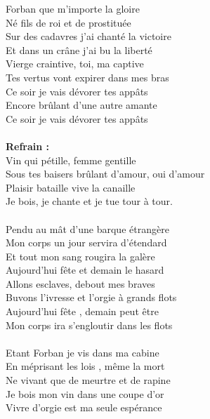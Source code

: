 
 Forban que m'importe la gloire
\\Né fils de roi et de prostituée
\\Sur des cadavres j'ai chanté la victoire
\\Et dans un crâne j'ai bu la liberté
\\Vierge craintive, toi, ma captive
\\Tes vertus vont expirer dans mes bras
\\Ce soir je vais dévorer tes appâts
\\Encore brûlant d'une autre amante
\\Ce soir je vais dévorer tes appâts
\\\\\textbf{Refrain :}
\\Vin qui pétille, femme gentille
\\Sous tes baisers brûlant d'amour, oui d'amour
\\Plaisir bataille vive la canaille
\\Je bois, je chante et je tue tour à tour.
\\\\Pendu au mât d'une barque étrangère
\\Mon corps un jour servira d'étendard
\\Et tout mon sang rougira la galère
\\Aujourd'hui fête et demain le hasard
\\Allons esclaves, debout mes braves
\\Buvons l'ivresse et l'orgie à grands flots
\\Aujourd'hui fête , demain peut être
\\Mon corps ira s'engloutir dans les flots
\\\\Etant Forban je vis dans ma cabine
\\En méprisant les lois , même la mort
\\Ne vivant que de meurtre et de rapine
\\Je bois mon vin dans une coupe d'or
\\Vivre d'orgie est ma seule espérance
